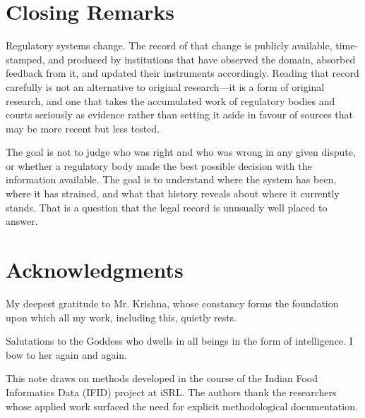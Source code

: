 \documentclass[12pt,a4paper]{article}
\begin{document}
\section{Closing Remarks}

Regulatory systems change. The record of that change is publicly available, time-stamped,
and produced by institutions that have observed the domain, absorbed feedback
from it, and updated their instruments accordingly. Reading that record carefully
is not an alternative to original research---it is a form of original research,
and one that takes the accumulated work of regulatory bodies and courts seriously
as evidence rather than setting it aside in favour of sources that may be more
recent but less tested.

The goal is not to judge who was right and who was wrong in any given dispute, or
whether a regulatory body made the best possible decision with the information
available. The goal is to understand where the system has been, where it has
strained, and what that history reveals about where it currently stands. That is a
question that the legal record is unusually well placed to answer.

\newpage
\section*{Acknowledgments}

My deepest gratitude to Mr. Krishna, whose constancy forms the foundation upon which all my work, including this, quietly rests.

Salutations to the Goddess who dwells in all beings in the form of intelligence. I bow to her again and again.


This note draws on methods developed in the course of the Indian Food Informatics
Data (IFID) project at iSRL. The authors thank the researchers whose applied work
surfaced the need for explicit methodological documentation.
\end{document}
